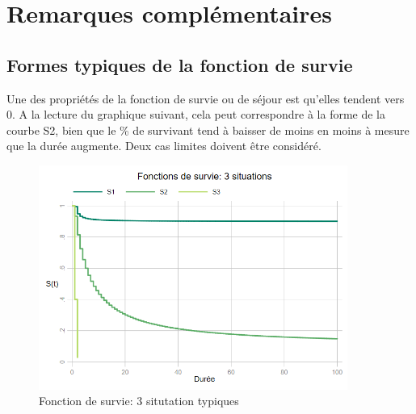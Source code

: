 \documentclass[
  12pt,
  letterpaper,
  DIV=11,
  numbers=noendperiod,
  onepage,
  openany]{scrreprt}
\begin{document}
\hypertarget{remarques-compluxe9mentaires}{%
\section{\texorpdfstring{\textbf{Remarques
complémentaires}}{Remarques complémentaires}}\label{remarques-compluxe9mentaires}}

\hypertarget{formes-typiques-de-la-fonction-de-survie}{%
\subsection{Formes typiques de la fonction de
survie}\label{formes-typiques-de-la-fonction-de-survie}}

Une des propriétés de la fonction de survie ou de séjour est qu'elles
tendent vers 0. A la lecture du graphique suivant, cela peut
correspondre à la forme de la courbe S2, bien que le \% de survivant
tend à baisser de moins en moins à mesure que la durée augmente. Deux
cas limites doivent être considéré.

\begin{figure}

\caption{Fonction de survie: 3 situtation typiques}

{\centering \includegraphics[width=0.9\textwidth,height=\textheight]{images/Image5b.png}

}

\end{figure}
\end{document}
